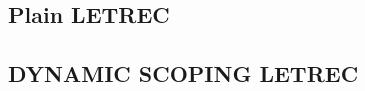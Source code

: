 \documentclass[../codeprint.tex]{subfiles}
\begin{document}
\subsection{Plain LETREC}



\subsection{DYNAMIC SCOPING LETREC}


\end{document}

